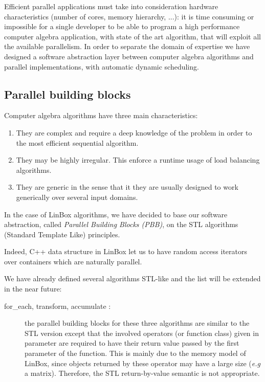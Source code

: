 \documentclass[runningheads,a4paper]{llncs}
\newcommand{\linbox}{{\sc LinBox}\xspace}
\begin{document}
Efficient parallel applications must take into consideration hardware
characteristics (number of cores, memory hierarchy, ...): it is time
consuming or impossible for a single developer to be able to
program a high performance computer algebra application, with state of
the art algorithm, that will exploit all the available parallelism.  
In order to separate the domain of expertise we have designed a
software abstraction layer between computer algebra algorithms
and parallel implementations, with automatic dynamic scheduling.

\subsection{Parallel building blocks}\label{ssec:parallel}
Computer algebra algorithms have three main characteristics:
\begin{enumerate}
\item They are complex and require a deep knowledge of the problem in
  order to the most efficient sequential algorithm.
\item They may be highly irregular. This enforce a runtime usage of
  load balancing algorithms.
\item They are generic in the sense that it they are usually designed
  to work generically over several input domains.
\end{enumerate}

  In the case of \linbox algorithms, we have decided to base our
  software abstraction, called {\em Parallel Building Blocks (PBB)},
  on the STL algorithms (Standard Template Like) principles.

  Indeed, C++ data structure in \linbox let us to have random access
  iterators over containers which are naturally parallel. 
  
  We have already defined several algorithms STL-like and the list
  will be extended in the near future:
  \begin{description} 
    
  \item [for\_each, transform, accumulate \cite{Musser:1996:STL}:] the parallel building
    blocks for these three algorithms are similar to the STL version 
    except that the involved operators (or function class) given in
    parameter are required to have their return value passed by the
    first parameter of the function. 
    This is mainly due to the memory model of \linbox, since objects
    returned by these operator may have a large size (\textit{e.g} a
    matrix).
    Therefore, the STL return-by-value semantic is not appropriate. 
  \end{description} 
  
\end{document}
